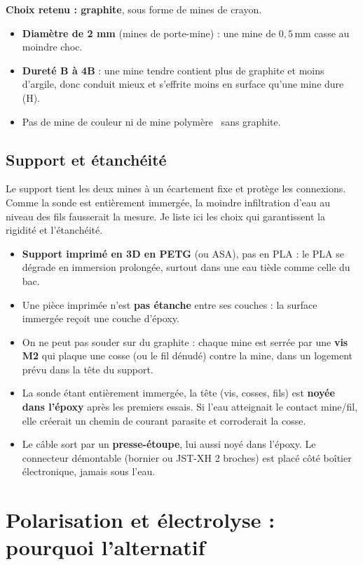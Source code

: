 \documentclass[11pt,a4paper]{article}
\newcommand{\U}[1]{\,\mathrm{#1}}
\begin{document}
\textbf{Choix retenu : graphite}, sous forme de mines de crayon.
\begin{itemize}[nosep]
\item \textbf{Diamètre de 2 mm} (mines de porte-mine) : une mine de $0{,}5\U{mm}$ casse au moindre choc.
\item \textbf{Dureté B à 4B} : une mine tendre contient plus de graphite et moins d'argile, donc conduit mieux et s'effrite moins en surface qu'une mine dure (H).
\item Pas de mine de couleur ni de mine \og polymère \fg\ sans graphite.
\end{itemize}

\subsection{Support et étanchéité}

Le support tient les deux mines à un écartement fixe et protège les connexions. Comme la sonde est entièrement immergée, la moindre infiltration d'eau au niveau des fils fausserait la mesure. Je liste ici les choix qui garantissent la rigidité et l'étanchéité.


\begin{itemize}[nosep]
\item \textbf{Support imprimé en 3D en PETG} (ou ASA), pas en PLA : le PLA se dégrade en immersion prolongée, surtout dans une eau tiède comme celle du bac.
\item Une pièce imprimée n'est \textbf{pas étanche} entre ses couches : la surface immergée reçoit une couche d'époxy.
\item On ne peut pas souder sur du graphite : chaque mine est serrée par une \textbf{vis M2} qui plaque une cosse (ou le fil dénudé) contre la mine, dans un logement prévu dans la tête du support.
\item La sonde étant entièrement immergée, la tête (vis, cosses, fils) est \textbf{noyée dans l'époxy} après les premiers essais. Si l'eau atteignait le contact mine/fil, elle créerait un chemin de courant parasite et corroderait la cosse.
\item Le câble sort par un \textbf{presse-étoupe}, lui aussi noyé dans l'époxy. Le connecteur démontable (bornier ou JST-XH 2 broches) est placé côté boîtier électronique, jamais sous l'eau.
\end{itemize}

\newpage
\section{Polarisation et électrolyse : pourquoi l'alternatif}
\label{sec:alternatif}
\end{document}

